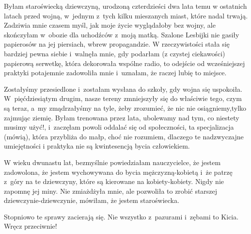\documentclass[oneside,polish,12pt,sfheadings]{mwbk}
\begin{document}
Byłam staroświecką dziewczyną, urodzoną czterdzieści dwa lata temu
w ostatnich latach przed wojną, w~jednym z~tych kilku mieszanych miast,
które nadal trwają. Zadziwia mnie czasem myśl, jak moje życie wyglądałoby
bez wojny, ale skończyłam w~obozie dla uchodźców z~moją matką. Szalone
Lesbijki nie gasiły papierosów na jej piersiach, wbrew propagandzie.
W rzeczywistości stała się bardziej pewna siebie i~walnęła mnie, gdy
podarłam (z czystej ciekawości) papierową serwetkę, która dekorowała
wspólne radio, to odejście od wcześniejszej praktyki potajemnie zadowoliła
mnie i~uznałam, że raczej lubię to miejsce.

Zostałyśmy przesiedlone i~zostałam wysłana do szkoły, gdy wojna się
uspokoiła. W~pięćdziesiątym drugim, nasze tereny zmniejszyły się do
właściwie tego, czym są teraz, a~my zmądrzałyśmy na tyle, żeby zrozumieć,
że nic nie osiągniemy,tylko zajmując ziemię. Byłam trenowana przez
lata, ubolewamy nad tym, co niestety musimy użyć!, i~zaczęłam powoli
oddalać się od społeczności, ta specjalizacja (mówią), która przybliża
do małp, choć nie rozumiem, dlaczego te nadzwyczajne umiejętności
i praktyka nie są kwintesencją bycia człowiekiem.

W wieku dwunastu lat, bezmyślnie powiedziałam nauczycielce, że jestem
zadowolona, że jestem wychowywana do bycia mężczyzną-kobietą i~że
patrzę z~góry na te dziewczyny, które są kierowane na kobiety-kobiety.
Nigdy nie zapomnę jej miny. Nie zmiażdżyła mnie, ale pozwoliła to
zrobić starszej dziewczynie-dziewczynie, mówiłam, że jestem staroświecka.

Stopniowo te sprawy zacierają się. Nie wszystko z~pazurami i~zębami
to Kicia. Wręcz przeciwnie!
\end{document}
